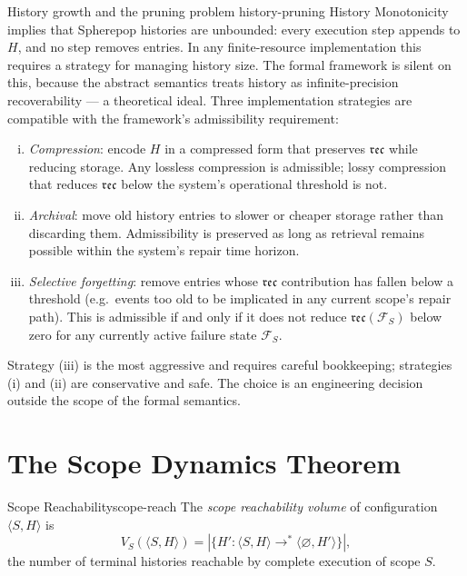 \documentclass[12pt,twoside,openright]{book}
\newcommand{\reco}{\mathfrak{rec}}
\begin{document}
\begin{remark}{History growth and the pruning problem}%
  {history-pruning}
  History Monotonicity implies that Spherepop histories
  are unbounded: every execution step appends to $H$,
  and no step removes entries. In any finite-resource
  implementation this requires a strategy for managing
  history size. The formal framework is silent on this,
  because the abstract semantics treats history as
  infinite-precision recoverability --- a theoretical
  ideal. Three implementation strategies are compatible
  with the framework's admissibility requirement:
  \begin{enumerate}[(i)]
    \item \emph{Compression}: encode $H$ in a
          compressed form that preserves $\reco$ while
          reducing storage. Any lossless compression
          is admissible; lossy compression that reduces
          $\reco$ below the system's operational
          threshold is not.
    \item \emph{Archival}: move old history entries to
          slower or cheaper storage rather than
          discarding them. Admissibility is preserved
          as long as retrieval remains possible within
          the system's repair time horizon.
    \item \emph{Selective forgetting}: remove entries
          whose $\reco$ contribution has fallen below
          a threshold (e.g.\ events too old to be
          implicated in any current scope's repair
          path). This is admissible if and only if it
          does not reduce $\reco(\mathcal{F}_S)$ below
          zero for any currently active failure state
          $\mathcal{F}_S$.
  \end{enumerate}
  Strategy (iii) is the most aggressive and requires
  careful bookkeeping; strategies (i) and (ii) are
  conservative and safe. The choice is an engineering
  decision outside the scope of the formal semantics.
\end{remark}

\section{The Scope Dynamics Theorem}

\begin{definition}{Scope Reachability}{scope-reach}
  The \emph{scope reachability volume} of configuration
  $\langle S, H \rangle$ is
  \[
    V_S(\langle S, H \rangle)
    = |\{H' : \langle S, H \rangle \to^* \langle \varnothing, H' \rangle\}|,
  \]
  the number of terminal histories reachable by complete
  execution of scope $S$.
\end{definition}
\end{document}
